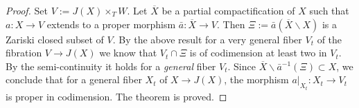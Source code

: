 \documentclass[11pt,english]{smfart}
\theoremstyle{plain}
\theoremstyle{definition}
\theoremstyle{remark}
\numberwithin{equation}{subsection}
\theoremstyle{plain}
\newcommand{\Spalg}{\mathrm{Sp}_{\mathrm{alg}}}
\begin{document}
\begin{proof}
Set $V:=J(X)\times_T W$. 	 Let $\overline{X}$ be a partial compactification of $X$ such that $a:X\to V$ extends to  a proper morphism $\bar{a}:\overline{X}\to V$.   Then $\Xi:=\bar{a}(\overline{X}\backslash X)$ is a Zariski closed subset of $V$.   By the above result  for a very general fiber $V_t$ of the fibration $V\to J(X)$  we know that $V_t\cap \Xi$ is of codimension at least two in $V_t$. By the semi-continuity it holds for a \emph{general} fiber $V_t$.   Since $ \overline{X}\backslash \bar{a}^{-1}(\Xi)\subset X$,  we conclude that for a  general fiber $X_t$ of $X\to J(X)$, the morphism $a|_{X_t}:X_t\to V_t$ 
	 is proper in codimension.  The theorem is proved. 
\end{proof} 

\end{document}
